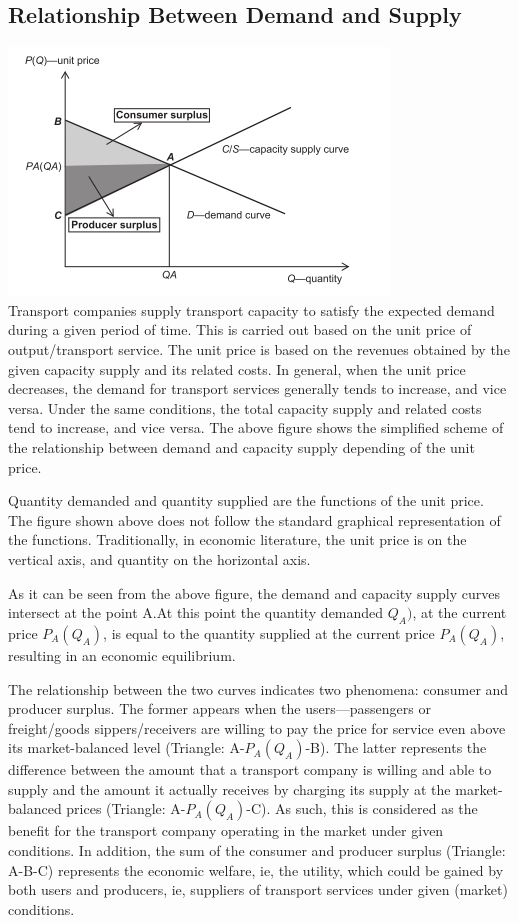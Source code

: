 \subsection{Relationship Between Demand and Supply}
\includegraphics{gfx/fig13.png}\\
Transport companies supply transport capacity to satisfy the expected demand during a given period of time. This is carried out based on the unit price of output/transport service. The unit price is based on the revenues obtained by the given capacity supply and its related costs. In general, when the unit price decreases, the demand for transport services generally tends to increase, and vice versa. Under the same conditions, the total capacity supply and related costs tend to increase, and vice versa. The above figure shows the simplified scheme of the relationship between demand and capacity supply depending of the unit price.\\
\par
Quantity demanded and quantity supplied are the functions of the unit price. The figure shown above does not follow the standard graphical representation of the functions. Traditionally, in economic literature, the unit price is on the vertical axis, and quantity on the horizontal axis.\\
\par
As it can be seen from the above figure, the demand and capacity supply curves intersect at the point A.At this point the quantity demanded $Q_A)$, at the current price $P_A(Q_A)$, is equal to the quantity supplied at the current price $P_A(Q_A)$, resulting in an economic equilibrium.\\
\par
The relationship between the two curves indicates two phenomena: consumer and producer surplus.
The former appears when the users—passengers or freight/goods sippers/receivers are willing to pay the price for service even above its market-balanced level (Triangle: A-$P_A(Q_A)$-B). The latter represents the difference between the amount that a transport company is willing and able to supply and the amount it actually receives by charging its supply at the market-balanced prices (Triangle: A-$P_A(Q_A)$-C). As such, this is considered as the benefit for the transport company operating in the market under given conditions. In addition, the sum of the consumer and producer surplus (Triangle: A-B-C) represents the economic welfare, ie, the utility, which could be gained by both users and producers, ie, suppliers of transport services under given (market) conditions.
%
